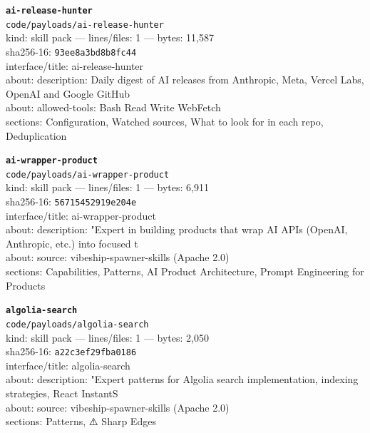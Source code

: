 \noindent\textbf{\texttt{ai-release-hunter}}\\
\texttt{code/payloads/ai-release-hunter}\\
kind: skill pack --- lines/files: 1 --- bytes: 11,587\\
sha256-16: \texttt{93ee8a3bd8b8fc44}\\
interface/title: ai-release-hunter\\
about: description: Daily digest of AI releases from Anthropic, Meta, Vercel Labs, OpenAI and Google GitHub\\
about: allowed-tools: Bash Read Write WebFetch\\
sections: Configuration, Watched sources, What to look for in each repo, Deduplication\\
\vspace*{6.0pt}

\noindent\textbf{\texttt{ai-wrapper-product}}\\
\texttt{code/payloads/ai-wrapper-product}\\
kind: skill pack --- lines/files: 1 --- bytes: 6,911\\
sha256-16: \texttt{56715452919e204e}\\
interface/title: ai-wrapper-product\\
about: description: "Expert in building products that wrap AI APIs (OpenAI, Anthropic, etc.) into focused t\\
about: source: vibeship-spawner-skills (Apache 2.0)\\
sections: Capabilities, Patterns, AI Product Architecture, Prompt Engineering for Products\\
\vspace*{6.0pt}

\noindent\textbf{\texttt{algolia-search}}\\
\texttt{code/payloads/algolia-search}\\
kind: skill pack --- lines/files: 1 --- bytes: 2,050\\
sha256-16: \texttt{a22c3ef29fba0186}\\
interface/title: algolia-search\\
about: description: "Expert patterns for Algolia search implementation, indexing strategies, React InstantS\\
about: source: vibeship-spawner-skills (Apache 2.0)\\
sections: Patterns, ⚠️ Sharp Edges\\
\vspace*{6.0pt}
\newpage

